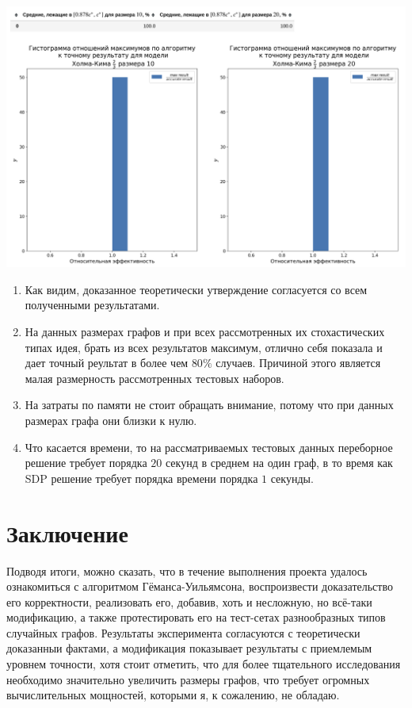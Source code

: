 \documentclass[12pt, a4paper]{article}
\begin{document}
\includegraphics[width=1\textwidth]{images/9.png}

\begin{enumerate}
    \item Как видим, доказанное теоретически утверждение согласуется со всем полученными результатами.
    \item На данных размерах графов и при всех рассмотренных их стохастических типах идея, брать из всех результатов максимум, отлично себя показала и дает точный реультат в более чем $80\%$ случаев. Причиной этого является малая размерность рассмотренных тестовых наборов.
    \item На затраты по памяти не стоит обращать внимание, потому что при данных размерах графа они близки к нулю.
    \item Что касается времени, то на рассматриваемых тестовых данных переборное решение требует порядка $20$ секунд в среднем на один граф, в то время как SDP решение требует порядка времени порядка $1$ секунды.
\end{enumerate}

\section{Заключение}
Подводя итоги, можно сказать, что в течение выполнения проекта удалось ознакомиться с алгоритмом Гёманса-Уильямсона, воспроизвести доказательство его корректности, реализовать его, добавив, хоть и несложную, но всё-таки модификацию, а также протестировать его на тест-сетах разнообразных типов случайных графов. Результаты эксперимента согласуются с теоретически доказанныи фактами, а модификация показывает результаты с приемлемым уровнем точности, хотя стоит отметить, что для более тщательного исследования необходимо значительно увеличить размеры графов, что требует огромных вычислительных мощностей, которыми я, к сожалению, не обладаю.
\end{document}
